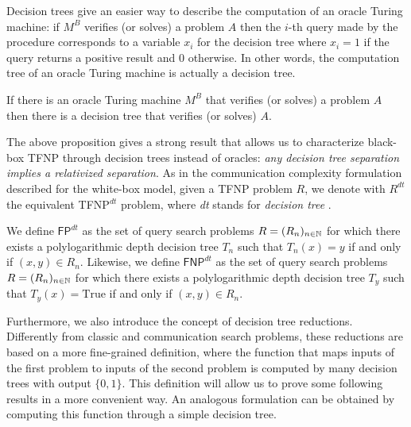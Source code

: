 Decision trees give an easier way to describe the computation of an oracle Turing machine: if $M^B$ verifies (or solves) a problem $A$ then the $i$-th query made by the procedure corresponds to a variable $x_i$ for the decision tree where $x_i = 1$ if the query returns a positive result and 0 otherwise. In other words, the computation tree of an oracle Turing machine is actually a decision tree.

\begin{proposition}
    If there is an oracle Turing machine $M^B$ that verifies (or solves) a problem $A$ then there is a decision tree that verifies (or solves) $A$. 
\end{proposition}

The above proposition gives a strong result that allows us to characterize black-box \textsf{TFNP} through decision trees instead of oracles: \textit{any decision tree separation implies a relativized separation}. As in the communication complexity formulation described for the white-box model, given a \textsf{TFNP} problem $R$, we denote with $R^{dt}$ the equivalent \textsf{TFNP}$^{dt}$ problem, where \textit{dt} stands for \textit{decision tree} \cite{proofs_circuits_communication, tfnp_characterization}.

\begin{definition}
    We define $\mathsf{FP}^{dt}$ as the set of query search problems $R = (R_n)_{n \in \mathbb{N}}$ for which there exists a polylogarithmic depth decision tree $T_n$ such that $T_n(x) = y$ if and only if $(x,y) \in R_n$. Likewise, we define $\mathsf{FNP}^{dt}$ as the set of query search problems $R = (R_n)_{n \in \mathbb{N}}$ for which there exists a polylogarithmic depth decision tree $T_y$ such that $T_y(x) = \mathrm{True}$ if and only if $(x,y) \in R_n$.
\end{definition}

Furthermore, we also introduce the concept of decision tree reductions. Differently from classic and communication search problems, these reductions are based on a more fine-grained definition, where the function that maps inputs of the first problem to inputs of the second problem is computed by many decision trees with output $\{0,1\}$. This definition will allow us to prove some following results in a more convenient way. An analogous formulation can be obtained by computing this function through a simple decision tree. 


